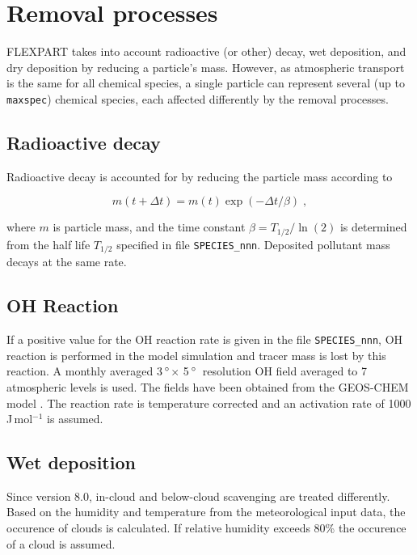 \documentclass{egu}                  %
\newcommand{\degreee}{{$\, \rm ^{\circ}$}}
\newcommand{\degreen}{{$\, \rm ^{\circ}$~}}
\begin{document}
\section{\label{removal}Removal processes}

FLEXPART takes into account radioactive (or other) decay, wet deposition, and
dry deposition by reducing a particle's mass.  However, as atmospheric
transport is the same for all chemical species, a single particle can represent
several (up to \verb|maxspec|) chemical species, each affected differently by
the removal processes.

\subsection{\label{radioactive}Radioactive decay}

Radioactive decay is accounted for by reducing the particle mass according to

\begin{equation}
m(t+\Delta t)=m(t) \exp (-\Delta t /\beta) \;,
\end{equation}

where $m$ is particle mass, and the time constant $\beta=T_{1/2}/\ln(2)$ is
determined from the half life $T_{1/2}$ specified in file \verb|SPECIES_nnn|.
Deposited pollutant mass decays at the same rate.

\subsection{OH Reaction}

If a positive value for the OH reaction rate is given in the file
\verb|SPECIES_nnn|, OH reaction is performed in the model simulation and tracer
mass is lost by this reaction.  A monthly averaged 3\degreee$\times$ 5\degreen resolution OH
field averaged to 7 atmospheric levels is used.  The fields have been obtained
from the GEOS-CHEM model \citep{bey2001}.  The reaction rate is temperature
corrected and an activation rate of 1000 J\,mol$^{-1}$ is assumed.

\subsection{\label{wetdepo}Wet deposition}

Since version 8.0, in-cloud and below-cloud scavenging are treated differently.
Based on the humidity and temperature from the meteorological input data, the
occurence of clouds is calculated.  If relative humidity exceeds 80\% the
occurence of a cloud is assumed.
\end{document}
